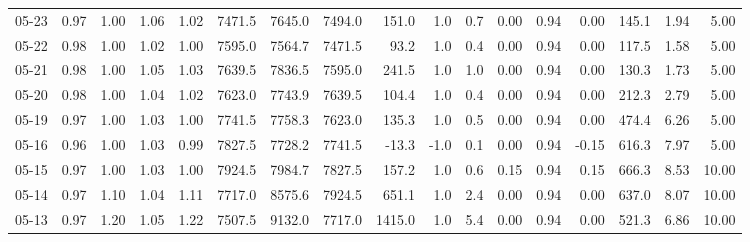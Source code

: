 \begin{threeparttable}
{\begin{tabular}{lrrrrrrrrrrrrrrrr}
  05-23 &         0.97 &           1.00 &          1.06 &          1.02 & 7471.5 & 7645.0 & 7494.0 &      151.0 &                      1.0 &                 0.7 &       0.00 &      0.94 &           0.00 &            145.1 &            1.94 &                   5.00 \\
  05-22 &         0.98 &           1.00 &          1.02 &          1.00 & 7595.0 & 7564.7 & 7471.5 &       93.2 &                      1.0 &                 0.4 &       0.00 &      0.94 &           0.00 &            117.5 &            1.58 &                   5.00 \\
  05-21 &         0.98 &           1.00 &          1.05 &          1.03 & 7639.5 & 7836.5 & 7595.0 &      241.5 &                      1.0 &                 1.0 &       0.00 &      0.94 &           0.00 &            130.3 &            1.73 &                   5.00 \\
  05-20 &         0.98 &           1.00 &          1.04 &          1.02 & 7623.0 & 7743.9 & 7639.5 &      104.4 &                      1.0 &                 0.4 &       0.00 &      0.94 &           0.00 &            212.3 &            2.79 &                   5.00 \\
  05-19 &         0.97 &           1.00 &          1.03 &          1.00 & 7741.5 & 7758.3 & 7623.0 &      135.3 &                      1.0 &                 0.5 &       0.00 &      0.94 &           0.00 &            474.4 &            6.26 &                   5.00 \\
  05-16 &         0.96 &           1.00 &          1.03 &          0.99 & 7827.5 & 7728.2 & 7741.5 &      -13.3 &                     -1.0 &                 0.1 &       0.00 &      0.94 &          -0.15 &            616.3 &            7.97 &                   5.00 \\
  05-15 &         0.97 &           1.00 &          1.03 &          1.00 & 7924.5 & 7984.7 & 7827.5 &      157.2 &                      1.0 &                 0.6 &       0.15 &      0.94 &           0.15 &            666.3 &            8.53 &                  10.00 \\
  05-14 &         0.97 &           1.10 &          1.04 &          1.11 & 7717.0 & 8575.6 & 7924.5 &      651.1 &                      1.0 &                 2.4 &       0.00 &      0.94 &           0.00 &            637.0 &            8.07 &                  10.00 \\
  05-13 &         0.97 &           1.20 &          1.05 &          1.22 & 7507.5 & 9132.0 & 7717.0 &     1415.0 &                      1.0 &                 5.4 &       0.00 &      0.94 &           0.00 &            521.3 &            6.86 &                  10.00 \\

\end{tabular}}
\end{threeparttable}
